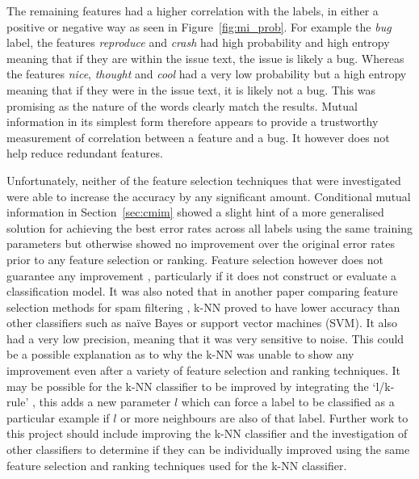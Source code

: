 The remaining features had a higher correlation with the labels, in either a positive or negative way as seen in
Figure~\ref{fig:mi_prob}. For example the \textit{bug} label, the features \textit{reproduce} and \textit{crash} had high
probability and high entropy meaning that if they are within the issue text, the issue is likely a bug. Whereas the features
\textit{nice}, \textit{thought} and \textit{cool} had a very low probability but a high entropy meaning that if they were in the
issue text, it is likely not a bug. This was promising as the nature of the words clearly match the results. Mutual information
in its simplest form therefore appears to provide a trustworthy measurement of correlation between a feature and a bug. It
however does not help reduce redundant features.

Unfortunately, neither of the feature selection techniques that were investigated were able to increase the accuracy by any
significant amount. Conditional mutual information in Section~\ref{sec:cmim} showed a slight hint of a more generalised solution
for achieving the best error rates across all labels using the same training parameters but otherwise showed no improvement
over the original error rates prior to any feature selection or ranking. Feature selection however does not guarantee any
improvement \cite{stability_feature_ranking}, particularly if it does not construct or evaluate a classification model. It was
also noted that in another paper comparing feature selection methods for spam filtering \cite{mlmethods_spamfiltering}, k-NN
proved to have lower accuracy than other classifiers such as na\"{i}ve Bayes or support vector machines (SVM). It also had a
very low precision, meaning that it was very sensitive to noise. This could be a possible explanation as to why the k-NN was
unable to show any improvement even after a variety of feature selection and ranking techniques. It may be possible for the k-NN
classifier to be improved by integrating the `l/k-rule' \cite{mlmethods_spamfiltering}, this adds a new parameter $l$ which can 
force a label to be classified as a particular example if $l$ or more neighbours are also of that label. Further work to this
project should include improving the k-NN classifier and the investigation of other classifiers to determine if they can be
individually improved using the same feature selection and ranking techniques used for the k-NN classifier.

% 
% 
% 
% 
% 